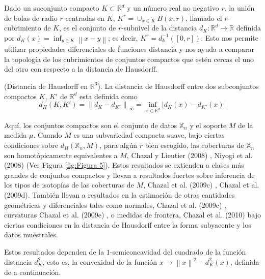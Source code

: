 Dado un suconjunto compacto $K\subset\mathbb{R}^{d}$ y un n\'umero real no negativo $r$, la uni\'on de
bolas de radio $r$ centradas en $K$, $K^{r} = \cup_{x\in K}B\left(x, r\right)$, llamado el
$r$-cubrimiento de $K$, es el conjunto de $r$-subnivel de la distancia
$d_{K}:\mathbb{R}^{d}\rightarrow\mathbb{R}$ definida por
$d_{K}\left(x\right) = \inf_{y\in K}\left\|x-y\right\|$; es decir,
$K^{r} = d^{-1}_{k}\left(\left[0, r\right]\right)$. Esto nos permite utilizar propiedades diferenciales
de funciones distancia y nos ayuda a comparar la topolog\'ia de los cubrimientos de conjuntos compactos
 que est\'en cercas el uno del otro con respecto a la distancia de Hausdorff.
 
\begin{definicion}
    (Distancia de Hausdorff en $\mathbb{R}^{3}$). La distancia de Hausdorff entre dos subconjuntos compactos
    $K$, $K'$ de $\mathbb{R}^{d}$ esta definida como
    \begin{equation*}
        d_{H}\left(K, K'\right) = \left\|d_{K}-d_{K'}\right\|_{\infty} =
        \inf_{x\in\mathbb{R}^{d}}\left|d_{K}\left(x\right)-d_{K'}\left(x\right)\right|
    \end{equation*}
\end{definicion}
 
Aqu\'i, los conjuntos compactos son el conjunto de datos $\mathbb{X}_{n}$ y el soporte $M$ de la
medida $\mu$. Cuando $M$ es una subvariedad compacta suave, bajo ciertas condiciones sobre
$d_{H}\left(\mathbb{X}_{n}, M\right)$, para alg\'un $r$ bien escogido, las coberturas de
$\mathbb{X}_{n}$ son homot\'opicamente equivalentes a $M$, Chazal y Lieutier (2008) \cite{Chazal2008},
Niyogi et al. (2008) \cite{Niyogi2008} (Ver Figura \ref{fig:Figura 5}). Estos resultados se extienden
a clases m\'as grandes de conjuntos compactos y llevan a resultados fuertes sobre inferencia de los
tipos de isotop\'ias de las coberturas de $M$, Chazal et al. (2009c) \cite{Chazal2009c},
Chazal et al. (2009d)\cite{Chazal2009d}. Tambi\'en llevan a resultados en la estimaci\'on de otras
cantidades geom\'etricas y diferenciales tales como normales, Chazal et al. (2009c) \cite{Chazal2009c},
curvaturas Chazal et al. (2009e) \cite{Chazal2009e}, o medidas de frontera,
Chazal et al. (2010) \cite{Chazal2010} bajo ciertas condiciones en la distancia de Hausdorff entre la
forma subyacente y los datos muestrales.
 
Estos resultados dependen de la $1$-semiconcavidad del cuadrado de la funci\'on distancia $d_{K}^{2}$,
esto es, la convexidad de la funci\'on $x\rightarrow\left\|x\right\|^{2}-d_{K}^{2}\left(x\right)$,
definida de a continuaci\'on.
 
